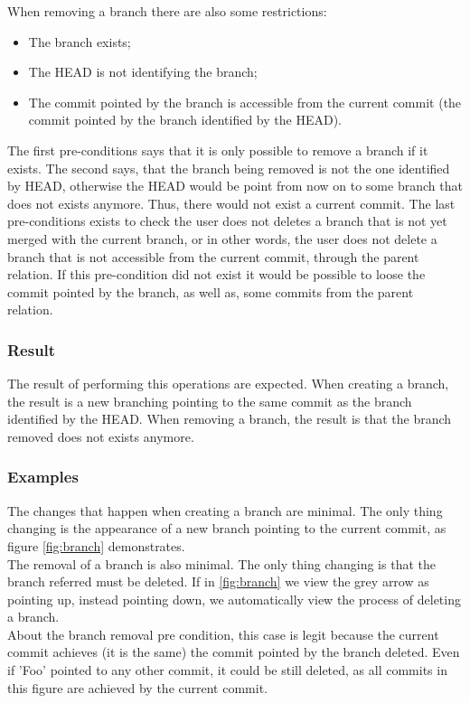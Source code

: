 When removing a branch there are also some restrictions:
\begin{itemize}
   \item The branch exists;
   \item The HEAD is not identifying the branch;
   \item The commit pointed by the branch is accessible from the
   current commit (the commit pointed by the branch identified by the
   HEAD).
\end{itemize}

The first pre-conditions says that it is only possible to remove a
branch if it exists. The second says, that the branch being removed is
not the one identified by HEAD, otherwise the HEAD would be point from
now on to some branch that does not exists anymore. Thus, there would
not exist a current commit. The last pre-conditions exists to check
the user does not deletes a branch that is not yet merged with the
current branch, or in other words, the user does not delete a branch
that is not accessible from the current commit, through the parent relation. 
If this pre-condition did not exist it would be possible to loose the
commit pointed by the branch, as well as, some commits from the parent
relation.


\subsubsection{Result}
The result of performing this operations are expected. When creating a
branch, the result is a new branching pointing to the same commit as
the branch identified by the HEAD. When removing a branch, the result
is that the branch removed does not exists anymore.

\subsubsection{Examples}
The changes that happen when creating a branch are minimal. The only thing
changing is the appearance of a new branch pointing to the current commit, as
figure \ref{fig:branch} demonstrates. \\ 
The removal of a branch is also minimal. The only thing changing is that the 
branch referred must be deleted. If in \ref{fig:branch} we view 
the grey arrow as pointing up, instead
pointing down, we automatically view the process of deleting a branch. \\ 
About the branch removal pre condition, this case
is legit because the current commit achieves (it is the same) the
commit pointed by the branch deleted. Even if 'Foo' pointed to any other commit, 
it could be still deleted, as all commits in this figure
are achieved by the current commit. \\

